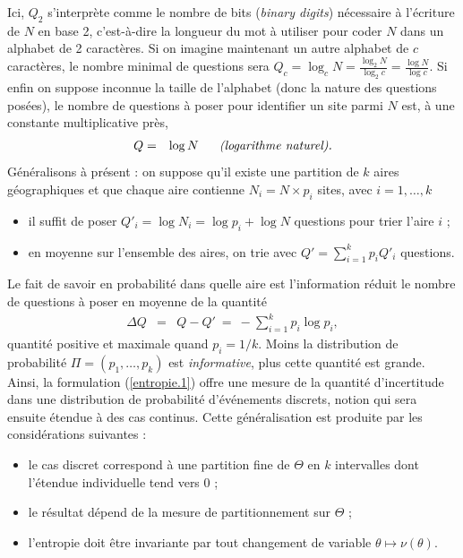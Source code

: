 Ici, $Q_2$ s'interprète comme le nombre de bits ({\it binary digits}) nécessaire à l'écriture de $N$ en base 2, c'est-à-dire la longueur du mot à utiliser pour coder $N$ dans un alphabet de 2 caractères. Si on imagine maintenant un autre alphabet de $c$ caractères, le nombre minimal de questions sera $Q_c = \log_c N = \frac{\log_2 N}{\log_2 c} = \frac{\log N}{\log c}$. Si enfin on suppose inconnue la taille de l'alphabet (donc la nature des questions posées), le nombre de questions à poser pour identifier un site parmi $N$ est, à une constante multiplicative près,
\begin{eqnarray*}
Q & = & \log N \ \ \ \ \ \text{\it (logarithme naturel).}
\end{eqnarray*}  
Généralisons à présent : on suppose qu'il existe une partition de $k$ aires géographiques et que chaque aire contienne $N_i = N\times p_i$ sites, avec $i=1,\ldots,k$
\begin{itemize}
\item il suffit de poser $Q'_i = \log N_i = \log p_i + \log N$ questions pour trier l'aire $i$ ; 
\item en moyenne sur l'ensemble des aires, on trie avec $Q'=\sum_{i=1}^k p_i Q'_i$ questions. 
\end{itemize}  
Le fait de savoir en probabilité dans quelle aire est l'information réduit le nombre de questions à poser en moyenne de la quantité
\begin{eqnarray}
\Delta Q & = & Q - Q' \ = \ - \sum\limits_{i=1}^k p_i \log p_i,  \label{entropie.1}
\end{eqnarray}   
quantité positive et maximale quand $p_i=1/k$. Moins la distribution de probabilité ${\Pi}=(p_1,\ldots,p_k)$ est {\it informative}, plus cette quantité est grande. Ainsi, la formulation (\ref{entropie.1}) offre une mesure de la quantité d'incertitude dans une distribution de probabilité d'événements discrets, notion qui sera ensuite étendue à des cas continus. Cette généralisation est produite par les considérations suivantes :
\begin{itemize}
\item le cas discret correspond à une partition fine de $\Theta$ en $k$ intervalles dont l'étendue individuelle tend vers 0 ;
\item le résultat dépend de la mesure de partitionnement sur $\Theta$ ; 
\item l'entropie doit être invariante par tout changement de variable $\theta\mapsto \nu(\theta)$.
\end{itemize}


